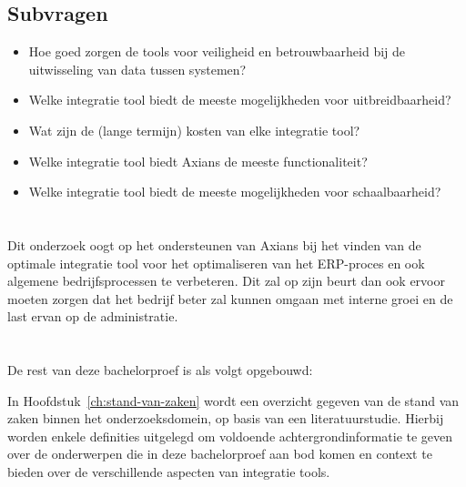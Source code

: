 \subsection{Subvragen}
\label{sec:SubvragenBP}
\begin{itemize}
  \item Hoe goed zorgen de tools voor veiligheid en betrouwbaarheid bij de uitwisseling van data tussen systemen?
  \item Welke integratie tool biedt de meeste mogelijkheden voor uitbreidbaarheid?
  \item Wat zijn de (lange termijn) kosten van elke integratie tool?
  \item Welke integratie tool biedt Axians de meeste functionaliteit?
  \item Welke integratie tool biedt de meeste mogelijkheden voor schaalbaarheid?
\end{itemize}

\section{}%
\label{sec:onderzoeksdoelstelling}

Dit onderzoek oogt op het ondersteunen van Axians bij het vinden van de optimale integratie tool voor het optimaliseren van het ERP-proces en ook algemene bedrijfsprocessen te verbeteren. Dit zal op zijn beurt dan ook ervoor moeten zorgen dat het bedrijf beter zal kunnen omgaan met interne groei en de last ervan op de administratie.

\section{}%
\label{sec:opzet-bachelorproef}


De rest van deze bachelorproef is als volgt opgebouwd:

\vspace{\baselineskip}

In Hoofdstuk~\ref{ch:stand-van-zaken} wordt een overzicht gegeven van de stand van zaken binnen het onderzoeksdomein, op basis van een literatuurstudie. Hierbij worden enkele definities uitgelegd om voldoende achtergrondinformatie te geven over de onderwerpen die in deze bachelorproef aan bod komen en context te bieden over de verschillende aspecten van integratie tools.

